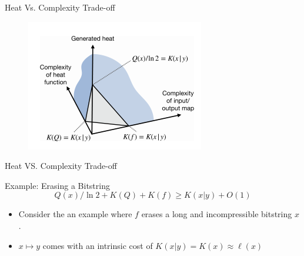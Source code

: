 \documentclass{beamer}
\begin{document}
\begin{frame}{Heat Vs. Complexity Trade-off}

    \begin{figure}
            \centering
            \includegraphics{HeatvsComplexity.png}
            \label{fig:my_label1}
        \end{figure}
    
\end{frame}


\begin{frame}{Heat VS. Complexity Trade-off}
    \begin{block}{Example: Erasing a Bitstring}
    \begin{equation*}
        Q(x)/\ln 2 + K(Q) + K(f) \ge K(x|y) + O(1)
    \end{equation*}
    \begin{itemize}
        \item Consider the an example where $f$ erases a long and incompressible bitstring $x$.
        \item $x\mapsto y$ comes with an intrinsic cost of $K(x|y) = K(x) \approx \ell(x)$
    \end{itemize}
    \end{block}
\end{frame}
\end{document}
